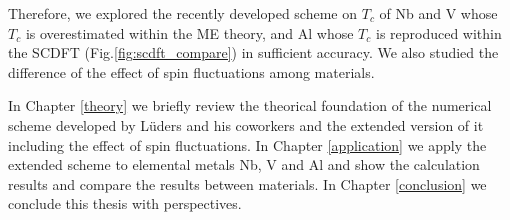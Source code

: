 Therefore, we explored the recently developed scheme on $T_c$ of Nb and V whose $T_c$ is overestimated
within the ME theory, and Al whose $T_c$ is reproduced within the SCDFT (Fig.\ref{fig:scdft_compare}) 
in sufficient accuracy. We also studied the difference of the effect of spin fluctuations among 
materials.

In Chapter \ref{theory} we briefly review the theorical foundation of the numerical scheme 
developed by L\"{u}ders and his coworkers\cite{Luders2005} and the extended version of it 
including the effect of spin fluctuations\cite{Essenberger2014}.
In Chapter \ref{application} we apply the extended scheme to elemental metals Nb, V and Al and show 
the calculation results and compare the results between materials.
In Chapter \ref{conclusion} we conclude this thesis with perspectives.


